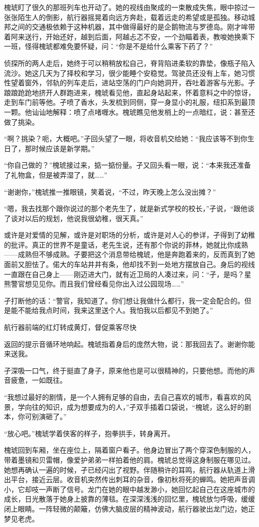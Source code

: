 \documentclass{article}
\begin{document}
槐琥盯了很久的那班列车也开动了。她的视线由聚成的一束散成失焦，眼中掠过一张张陌生人的倒影，航行器摇晃着向远方奔赴，载着远走的希望或是孤独。移动城邦之间的交通极依赖于这种机器，其中做得最好的是企鹅物流与罗德岛。刚才哞带着阿来送行，开始还好，越到后面，阿越忐忑不安，一个劲瞄着表，教唆她换乘下一班，怪得槐琥都难免要怀疑，问：“你是不是给什么乘客下药了？”

侦探所的两人走后，她终于可以稍稍放松自己，脊背陷进柔软的靠垫，像瓶子陷入流沙。她这几天为了择校和学习，很少能睡个安稳觉。驾驶员还没有上车，她习惯性望着窗外，邻轨的列车走后，进站空荡的门户向她洞开，吞吐着游客与光影。孑踉踉跄跄地挤开人群跑进来，槐琥看见他，直起身站起来，怀着意料之中的惊讶，走到车门前等他。孑喷了香水，头发梳到同侧，穿一身显小的礼服，纽扣系到最顶一颗。他讪讪地解释：喷了点啫喱水。槐琥瞧见他发梢上的一点暗红，说：甚至还做了挑染。

“啊？挑染？呃，大概吧。”孑回头望了一眼，将收音机交给她：“我应该等不到你生日了，那时候应该是新学期。”

\newpage 



“你自己做的？”槐琥接过来，掂一掂份量。孑又回头看一眼，说：“本来我还准备了礼物盒，但是被弄湿了，就……”

“谢谢你，”槐琥推一推眼镜，笑着说，“不过，昨天晚上怎么没出摊？”

“嗯，我去找那个跟你说过的那个老先生了，就是新式学校的校长，”孑说，“跟他谈了谈对以后的规划，他说我很幼稚，很天真。”

或许是对爱情的见解，或许是对职场的分析，或许是对人心的参详，孑得到了幼稚的批评。真正的世界不是童话，老先生说，还有那个你说的菲林，她就比你成熟——成熟但不够成熟。孑要把这个消息带给槐琥，他是奔跑着来的，反而真到了她面前又胆怯了。偌大的车站井井有条，他却找不到一处地方摆放自己。身后的视线一直跟在自己身上——刚迈进大门，就有近卫局的人凑过来，问：“孑，是吗？星熊警官想见见你。而且我们曾经看见你出入过公园现场……”

孑打断他的话：“警官，我知道了。你们想让我做什么都行，我一定会配合的。但是能不能给我点时间，我来这里送个人。我怕我以后都见不到她了。”

航行器前端的红灯转成黄灯，督促乘客尽快

\newpage 

返回的提示音循环地响起。槐琥指着身后的庞然大物，说：那我回去了。谢谢你能来送我。

孑深吸一口气，终于挺直了身子，原来他也是可以很精神的，只要他想。而他的声音疲惫，一如既往。

“我想过最好的剧情，是一个人拥有足够的自由，去自己喜欢的城市，看喜欢的风景，学向往的知识，成为想要成为的人，”孑双手插着口袋说，“槐琥，这么好的剧本，你可别演砸了。”

“放心吧。”槐琥学着侠客的样子，抱拳拱手，转身离开。

槐琥回到车厢，坐在座位上，隔着窗户看孑。他身边冒出了两个穿深色制服的人，带着墨镜和贝雷帽，像爱护弟弟一样拍着他的肩。槐琥总觉得这身制服在哪见过。她想再确认一遍的时候，孑已经闪出了视野。伴随稍许的耳鸣，航行器从轨道上滑出平台，接近云层。收音机突然传出刺耳的杂音，像初秋将死的蝉鸣。她把声音调小，它却吱一声断了信号。龙门在她的眼中越发渺小，她回忆起自己在这座城市的成长，日光散落于她身上披靠的薄毯。在深深浅浅的回忆里，槐琥放匀呼吸，缓缓闭上眼睛。一阵轻微的颠簸，仿佛大脑皮层的精神波动，航行器驶出龙门边，她正梦见老虎。

\newpage 
\end{document}
